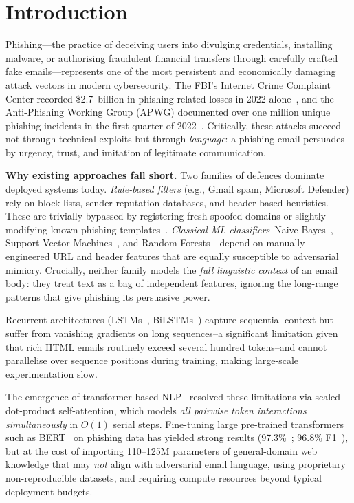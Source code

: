 \documentclass[sigconf, nonacm]{acmart}
\begin{document}
\section{Introduction}

Phishing—the practice of deceiving users into divulging credentials,
installing malware, or authorising fraudulent financial transfers
through carefully crafted fake emails—represents one of the most
persistent and economically damaging attack vectors in modern
cybersecurity.
The FBI's Internet Crime Complaint Center recorded \$2.7~billion in
phishing-related losses in 2022 alone~\cite{fbi2022}, and the
Anti-Phishing Working Group (APWG) documented over one million unique
phishing incidents in the first quarter of 2022~\cite{apwg2022}.
Critically, these attacks succeed not through technical exploits but
through \emph{language}: a phishing email persuades by urgency, trust,
and imitation of legitimate communication.

\textbf{Why existing approaches fall short.}
Two families of defences dominate deployed systems today.
\emph{Rule-based filters} (e.g., Gmail spam, Microsoft Defender) rely
on block-lists, sender-reputation databases, and header-based
heuristics.
These are trivially bypassed by registering fresh spoofed domains or
slightly modifying known phishing templates~\cite{fette2007}.
\emph{Classical ML classifiers}--Naive Bayes~\cite{metsis2006},
Support Vector Machines~\cite{sahoo2017}, and Random
Forests~\cite{fette2007}--depend on manually engineered URL and
header features that are equally susceptible to adversarial mimicry.
Crucially, neither family models the \emph{full linguistic context} of
an email body: they treat text as a bag of independent features,
ignoring the long-range patterns that give phishing its persuasive
power.

Recurrent architectures (LSTMs~\cite{hochreiter1997},
BiLSTMs~\cite{elalfy2017}) capture sequential context but suffer from
vanishing gradients on long sequences--a significant limitation given
that rich HTML emails routinely exceed several hundred tokens--and
cannot parallelise over sequence positions during training, making
large-scale experimentation slow.

The emergence of transformer-based NLP~\cite{vaswani2017} resolved
these limitations via scaled dot-product self-attention, which models
\emph{all pairwise token interactions simultaneously} in $O(1)$ serial
steps.
Fine-tuning large pre-trained transformers such as
BERT~\cite{devlin2019} on phishing data has yielded strong results
(97.3\%~\cite{goel2021}; 96.8\% F1~\cite{bountakas2023}), but at the
cost of importing 110--125M parameters of general-domain web knowledge
that may \emph{not} align with adversarial email language, using
proprietary non-reproducible datasets, and requiring compute resources
beyond typical deployment budgets.
\end{document}
